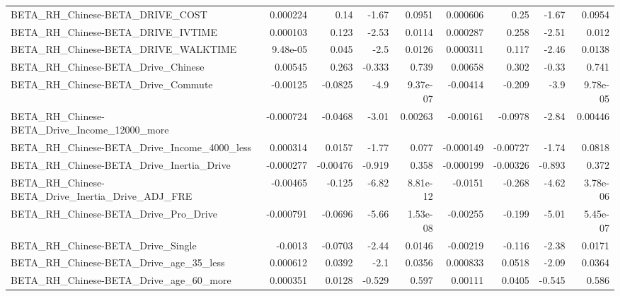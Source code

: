 \begin{tabular}{lrrrrrrrr}
BETA\_RH\_Chinese-BETA\_DRIVE\_COST                    &    0.000224 &         0.14 &    -1.67 &   0.0951 &   0.000606 &        0.25 &        -1.67 &        0.0954 \\
BETA\_RH\_Chinese-BETA\_DRIVE\_IVTIME                  &    0.000103 &        0.123 &    -2.53 &   0.0114 &   0.000287 &       0.258 &        -2.51 &         0.012 \\
BETA\_RH\_Chinese-BETA\_DRIVE\_WALKTIME                &    9.48e-05 &        0.045 &     -2.5 &   0.0126 &   0.000311 &       0.117 &        -2.46 &        0.0138 \\
BETA\_RH\_Chinese-BETA\_Drive\_Chinese                 &     0.00545 &        0.263 &   -0.333 &    0.739 &    0.00658 &       0.302 &        -0.33 &         0.741 \\
BETA\_RH\_Chinese-BETA\_Drive\_Commute                 &    -0.00125 &      -0.0825 &     -4.9 & 9.37e-07 &   -0.00414 &      -0.209 &         -3.9 &      9.78e-05 \\
BETA\_RH\_Chinese-BETA\_Drive\_Income\_12000\_more       &   -0.000724 &      -0.0468 &    -3.01 &  0.00263 &   -0.00161 &     -0.0978 &        -2.84 &       0.00446 \\
BETA\_RH\_Chinese-BETA\_Drive\_Income\_4000\_less        &    0.000314 &       0.0157 &    -1.77 &    0.077 &  -0.000149 &    -0.00727 &        -1.74 &        0.0818 \\
BETA\_RH\_Chinese-BETA\_Drive\_Inertia\_Drive           &   -0.000277 &     -0.00476 &   -0.919 &    0.358 &  -0.000199 &    -0.00326 &       -0.893 &         0.372 \\
BETA\_RH\_Chinese-BETA\_Drive\_Inertia\_Drive\_ADJ\_FRE   &    -0.00465 &       -0.125 &    -6.82 & 8.81e-12 &    -0.0151 &      -0.268 &        -4.62 &      3.78e-06 \\
BETA\_RH\_Chinese-BETA\_Drive\_Pro\_Drive               &   -0.000791 &      -0.0696 &    -5.66 & 1.53e-08 &   -0.00255 &      -0.199 &        -5.01 &      5.45e-07 \\
BETA\_RH\_Chinese-BETA\_Drive\_Single                  &     -0.0013 &      -0.0703 &    -2.44 &   0.0146 &   -0.00219 &      -0.116 &        -2.38 &        0.0171 \\
BETA\_RH\_Chinese-BETA\_Drive\_age\_35\_less             &    0.000612 &       0.0392 &     -2.1 &   0.0356 &   0.000833 &      0.0518 &        -2.09 &        0.0364 \\
BETA\_RH\_Chinese-BETA\_Drive\_age\_60\_more             &    0.000351 &       0.0128 &   -0.529 &    0.597 &    0.00111 &      0.0405 &       -0.545 &         0.586 \\

\end{tabular}
